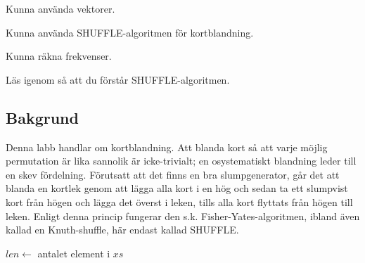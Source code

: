 

\Lab{\LabWeekFIVE}

\begin{Goals}
\item Kunna använda vektorer.
\item Kunna använda SHUFFLE-algoritmen för kortblandning.
\item Kunna räkna frekvenser.
\end{Goals}

\begin{Preparations}
\item Läs igenom så att du förstår SHUFFLE-algoritmen.
\end{Preparations}

\subsection{Bakgrund}

Denna labb handlar om kortblandning. Att blanda kort så att varje möjlig permutation är lika sannolik är icke-trivialt; en osystematiskt blandning leder till en skev fördelning. Förutsatt att det finns en bra slumpgenerator, går det att blanda en kortlek genom att lägga alla kort i en hög och sedan ta ett slumpvist kort från högen och lägga det överst i leken, tills alla kort flyttats från högen till leken. Enligt denna princip fungerar den s.k. Fisher-Yates-algoritmen, ibland även kallad en Knuth-shuffle, här endast kallad SHUFFLE.


\begin{algorithm}[H]
 $len \leftarrow$ antalet element i $xs$ \\
\end{algorithm}

